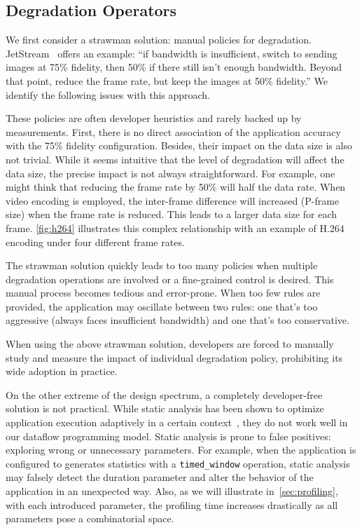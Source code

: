 \subsection{Degradation Operators}
\label{sec:prog-abs}

We first consider a strawman solution: manual policies for
degradation. JetStream~\cite{rabkin2014aggregation} offers an example: ``if
bandwidth is insufficient, switch to sending images at 75\% fidelity, then 50\%
if there still isn't enough bandwidth. Beyond that point, reduce the frame rate,
but keep the images at 50\% fidelity.'' We identify the following issues with
this approach.

 These policies are often developer heuristics and
rarely backed up by measurements. First, there is no direct association of the
application accuracy with the 75\% fidelity configuration. Besides, their impact
on the data size is also not trivial.  While it seems intuitive that the level
of degradation will affect the data size, the precise impact is not always
straightforward. For example, one might think that reducing the frame rate by
50\% will half the data rate. When video encoding is employed, the inter-frame
difference will increased (P-frame size) when the frame rate is reduced. This
leads to a larger data size for each frame. \autoref{fig:h264} illustrates this
complex relationship with an example of H.264 encoding under four different
frame rates.

 The strawman solution quickly leads to too many policies
when multiple degradation operations are involved or a fine-grained control is
desired. This manual process becomes tedious and error-prone. When too few rules
are provided, the application may oscillate between two rules: one that's too
aggressive (always faces insufficient bandwidth) and one that's too
conservative.

\vspace{0.5em}

When using the above strawman solution, developers are forced to manually study
and measure the impact of individual degradation policy, prohibiting its wide
adoption in practice.

On the other extreme of the design spectrum, a completely developer-free
solution is not practical. While static analysis has been shown to optimize
application execution adaptively in a certain context~\cite{chun2011clonecloud},
they do not work well in our dataflow programming model. Static analysis is
prone to false positives: exploring wrong or unnecessary parameters. For
example, when the application is configured to generates statistics with a
\texttt{timed\_window} operation, static analysis may falsely detect the
duration parameter and alter the behavior of the application in an unexpected
way. Also, as we will illustrate in~\autoref{sec:profiling}, with each
introduced parameter, the profiling time increases drastically as all parameters
pose a combinatorial space.

